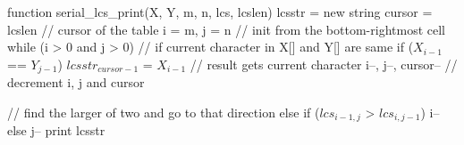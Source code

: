 \documentclass[usletter, 11pt]{extarticle}
\begin{document}
\begin{pseudocode}[caption={Serial Longest Common Subsequence Printing},
label={alg2}]
function serial_lcs_print(X, Y, m, n, lcs, lcslen)
    lcsstr = new string
    cursor = lcslen  // cursor of the table
    i = m, j = n  // init from the bottom-rightmost cell
    while (i > 0 and j > 0)
        // if current character in X[] and Y[] are same
        if ($X_{i - 1}$ == $Y_{j - 1}$)
            $lcsstr_{cursor - 1}$ = $X_{i - 1}$  // result gets current character
            i--, j--, cursor--  // decrement i, j and cursor

        // find the larger of two and go to that direction
        else if ($lcs_{i - 1, j}$ > $lcs_{i,j - 1}$)
            i--
        else
            j--
    print lcsstr

\end{pseudocode}
\end{document}
